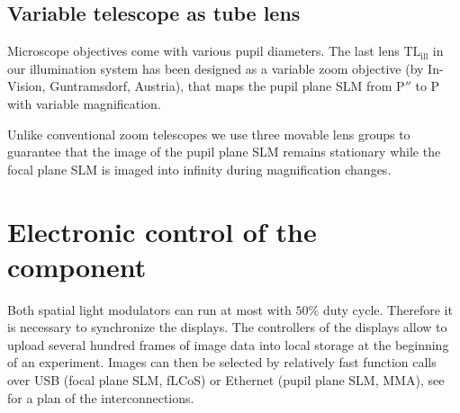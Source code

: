 
 	
	  	

\subsection{ Variable telescope as tube lens}
Microscope objectives come with various pupil diameters. The last lens
$\textrm{TL}_\textrm{ill}$ in our illumination system has been
designed as a variable zoom objective (by In-Vision, Guntramsdorf,
Austria), that maps the pupil plane SLM from $\textrm{P}''$ to
$\textrm{P}$ with variable magnification.

Unlike conventional zoom telescopes we use three movable lens groups
to guarantee that the image of the pupil plane SLM remains stationary
while the focal plane SLM is imaged into infinity during magnification
changes.



\section{Electronic control of the component}
Both spatial light modulators can run at most with $50\%$ duty
 cycle. Therefore it is necessary to
synchronize the displays. The controllers of the displays allow to
upload several hundred frames of image data into local storage at the
beginning of an experiment. Images can then be selected by relatively
fast function calls over USB (focal plane SLM, fLCoS) or Ethernet
(pupil plane SLM, MMA), see  for a plan
of the interconnections.

